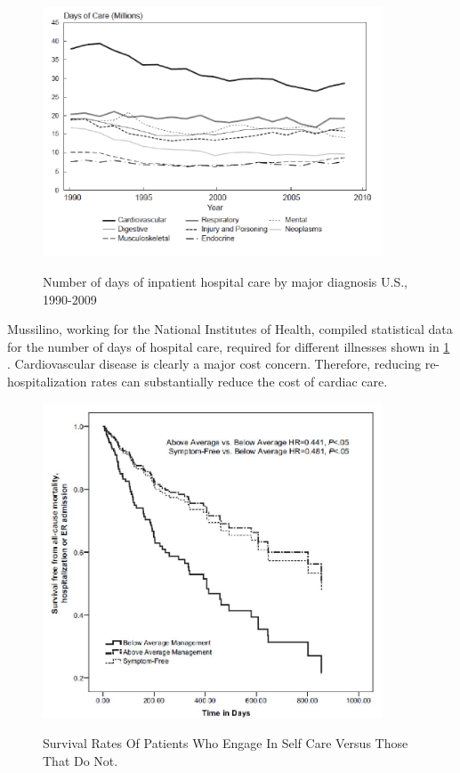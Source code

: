 \begin{figure}
	\begin{center}
		\label{fig:DaysofCare}
		\includegraphics[scale=1,width=0.9\textwidth]{Images/DaysOfCare.png} 
		\caption{Number of days of inpatient hospital care by major diagnosis U.S., 1990-2009 }
	\end{center}
\end{figure}

Mussilino, working for the National Institutes of Health, compiled statistical data for the number of days of hospital care, required for different illnesses shown in  \cref{fig:DaysofCare} \cite{Mussolino2012}. Cardiovascular disease is clearly a major cost concern. Therefore, reducing re-hospitalization rates can substantially reduce the cost of cardiac care.


\begin{figure}
	\begin{center}
		\label{fig:SurvivalRates}
		\includegraphics[scale=1,width=0.9\textwidth]{Images/SurvivalRate.jpg} 
		\caption{Survival Rates Of Patients Who Engage In Self Care Versus Those That Do Not.}
	\end{center}
\end{figure}

